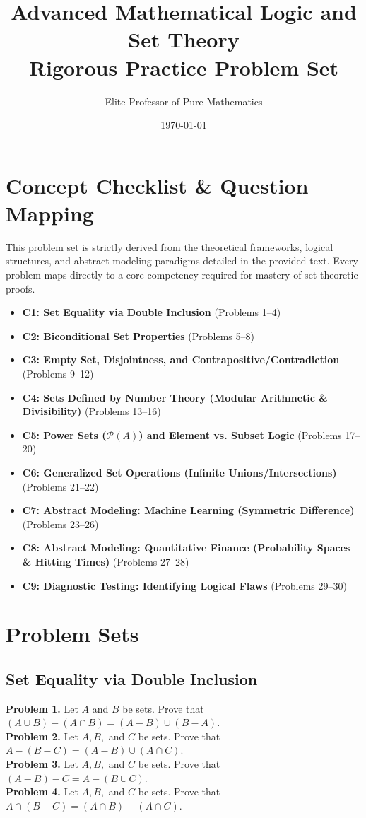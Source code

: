 \documentclass[11pt]{article}
\title{\textbf{Advanced Mathematical Logic and Set Theory}\\ \Large Rigorous Practice Problem Set}
\author{Elite Professor of Pure Mathematics}
\date{\today}
\begin{document}
\maketitle

\tableofcontents
\newpage

\section{Concept Checklist \& Question Mapping}
\label{sec:mapping_start}
This problem set is strictly derived from the theoretical frameworks, logical structures, and abstract modeling paradigms detailed in the provided text. Every problem maps directly to a core competency required for mastery of set-theoretic proofs.

\begin{itemize}
    \item \textbf{C1: Set Equality via Double Inclusion} (Problems 1--4)
    \item \textbf{C2: Biconditional Set Properties} (Problems 5--8)
    \item \textbf{C3: Empty Set, Disjointness, and Contrapositive/Contradiction} (Problems 9--12)
    \item \textbf{C4: Sets Defined by Number Theory (Modular Arithmetic \& Divisibility)} (Problems 13--16)
    \item \textbf{C5: Power Sets ($\mathcal{P}(A)$) and Element vs. Subset Logic} (Problems 17--20)
    \item \textbf{C6: Generalized Set Operations (Infinite Unions/Intersections)} (Problems 21--22)
    \item \textbf{C7: Abstract Modeling: Machine Learning (Symmetric Difference)} (Problems 23--26)
    \item \textbf{C8: Abstract Modeling: Quantitative Finance (Probability Spaces \& Hitting Times)} (Problems 27--28)
    \item \textbf{C9: Diagnostic Testing: Identifying Logical Flaws} (Problems 29--30)
\end{itemize}

\newpage

\section{Problem Sets}
\label{sec:problems}

\subsection{Set Equality via Double Inclusion}
\noindent \textbf{Problem 1.} Let $A$ and $B$ be sets. Prove that $(A \cup B) - (A \cap B) = (A - B) \cup (B - A)$. \\
\textbf{Problem 2.} Let $A, B,$ and $C$ be sets. Prove that $A - (B - C) = (A - B) \cup (A \cap C)$. \\
\textbf{Problem 3.} Let $A, B,$ and $C$ be sets. Prove that $(A - B) - C = A - (B \cup C)$. \\
\textbf{Problem 4.} Let $A, B,$ and $C$ be sets. Prove that $A \cap (B - C) = (A \cap B) - (A \cap C)$.
\end{document}
